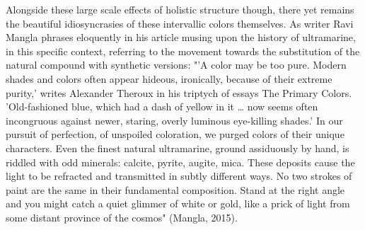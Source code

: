 Alongside these large scale effects of holistic structure though, there
yet remains the beautiful idiosyncrasies of these intervallic colors
themselves. As writer Ravi Mangla phrases eloquently in his article
musing upon the history of ultramarine, in this specific context,
referring to the movement towards the substitution of the natural
compound with synthetic versions: "'A color may be too pure. Modern
shades and colors often appear hideous, ironically, because of their
extreme purity,' writes Alexander Theroux in his triptych of essays The
Primary Colors. 'Old-fashioned blue, which had a dash of yellow in it
\ldots{} now seems often incongruous against newer, staring, overly
luminous eye-killing shades.' In our pursuit of perfection, of unspoiled
coloration, we purged colors of their unique characters. Even the finest
natural ultramarine, ground assiduously by hand, is riddled with odd
minerals: calcite, pyrite, augite, mica. These deposits cause the light
to be refracted and transmitted in subtly different ways. No two strokes
of paint are the same in their fundamental composition. Stand at the
right angle and you might catch a quiet glimmer of white or gold, like a
prick of light from some distant province of the cosmos" (Mangla, 2015).

